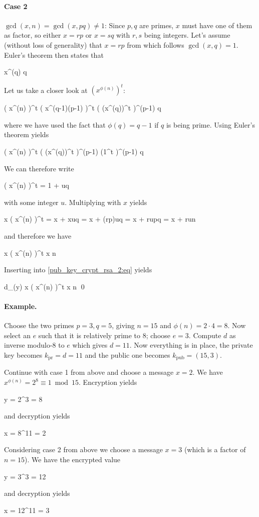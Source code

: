 \paragraph{Case 2} $\gcd(x,n) = \gcd(x, pq) \neq 1$: Since $p,q$ are primes, $x$ must have one of them as factor, so either $x = rp$ or $x = sq$ with $r,s$ being integers. Let's assume (without loss of generality) that $x = rp$ from which follows $\gcd(x,q) = 1$. Euler's theorem then states that

\bee
x^{\phi(q)}  \bmod q
\eee

Let us take a closer look at $\left( x^{\phi(n)} \right)^t$:

\bee
\left( x^{\phi(n)} \right)^t \equiv \left( x^{(q-1)(p-1)} \right)^t \equiv \left( (x^{\phi(q)})^t \right)^{(p-1)} \bmod q
\eee

where we have used the fact that $\phi(q) = q-1$ if $q$ is being prime. Using Euler's theorem yields

\bee
\left( x^{\phi(n)} \right)^t \equiv \left( (x^{\phi(q)})^t \right)^{(p-1)} \equiv \left(1^t \right)^{(p-1)}  \bmod q
\eee

We can therefore write

\bee
\left( x^{\phi(n)} \right)^t = 1 + uq
\eee

with some integer $u$. Multiplying with $x$ yields

\bee
x \left( x^{\phi(n)} \right)^t = x + xuq = x + (rp)uq = x + rupq = x + run
\eee

and therefore we have

\bee
x \left( x^{\phi(n)} \right)^t \equiv x \bmod n
\eee

Inserting into \eqref{pub_key_crypt_rsa_2:eq} yields

\bee
d_{}(y) \equiv x \left( x^{\phi(n)} \right)^t \equiv x \bmod n \qed
\eee


\paragraph{Example.} Choose the two primes $p=3, q=5$, giving $n=15$ and $\phi(n) = 2 \cdot 4 = 8$. Now select an $e$ such that it is relatively prime to $8$; choose $e = 3$. Compute $d$ as inverse modulo-8 to $e$ which gives $d = 11$. Now everything is in place, the private key becomes $k_{\text{pr}} = d = 11$ and the public one becomes $k_{\text{pub}} = (15,3)$.

Continue with case 1 from above and choose a message $x=2$. We have $x^{\phi(n)} = 2^8 \equiv 1 \bmod 15$. Encryption yields

\bee
y = 2^3  = 8
\eee

and decryption yields

\bee
x = 8^11  = 2
\eee

Considering case 2 from above we choose a message $x = 3$ (which is a factor of $n=15$). We have the encrypted value

\bee
y = 3^3  = 12
\eee

and decryption yields

\bee
x = 12^{11}  = 3
\eee